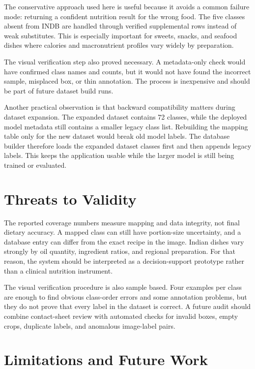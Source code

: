 \documentclass[conference]{IEEEtran}
\newcommand{\code}[1]{\texttt{\detokenize{#1}}}
\begin{document}
The conservative approach used here is useful because it avoids a common failure mode: returning a confident nutrition result for the wrong food. The five classes absent from INDB are handled through verified supplemental rows instead of weak substitutes. This is especially important for sweets, snacks, and seafood dishes where calories and macronutrient profiles vary widely by preparation.

The visual verification step also proved necessary. A metadata-only check would have confirmed class names and counts, but it would not have found the incorrect \code{jalebi} sample, misplaced \code{kaara_chutney} box, or thin \code{nandu_masala} annotation. The process is inexpensive and should be part of future dataset build runs.

Another practical observation is that backward compatibility matters during dataset expansion. The expanded dataset contains 72 classes, while the deployed model metadata still contains a smaller legacy class list. Rebuilding the mapping table only for the new dataset would break old model labels. The database builder therefore loads the expanded dataset classes first and then appends legacy labels. This keeps the application usable while the larger model is still being trained or evaluated.

\section{Threats to Validity}

The reported coverage numbers measure mapping and data integrity, not final dietary accuracy. A mapped class can still have portion-size uncertainty, and a database entry can differ from the exact recipe in the image. Indian dishes vary strongly by oil quantity, ingredient ratios, and regional preparation. For that reason, the system should be interpreted as a decision-support prototype rather than a clinical nutrition instrument.

The visual verification procedure is also sample based. Four examples per class are enough to find obvious class-order errors and some annotation problems, but they do not prove that every label in the dataset is correct. A future audit should combine contact-sheet review with automated checks for invalid boxes, empty crops, duplicate labels, and anomalous image-label pairs.

\section{Limitations and Future Work}
\end{document}
